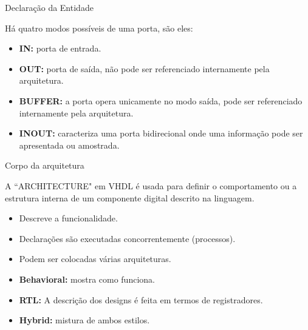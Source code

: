 \documentclass[aspectratio=169]{beamer}
\begin{document}
\begin{frame}{Declaração da Entidade}
	\justifying
	
	Há quatro modos possíveis de uma porta, são eles:
	
	\begin{itemize}
		\item \textbf{IN:} porta de entrada.
		\item \textbf{OUT:} porta de saída, não pode ser referenciado internamente pela arquitetura.
		\item \textbf{BUFFER:} a porta opera unicamente no modo saída, pode ser referenciado internamente pela arquitetura.
		\item \textbf{INOUT:} caracteriza uma porta bidirecional onde uma informação pode ser apresentada ou amostrada.
	\end{itemize}
	
	
	
\end{frame}
\begin{frame}{Corpo da arquitetura}
	\justifying
	
	
	\begin{block}{}
	\justifying
	A ``ARCHITECTURE" em VHDL é usada para definir o comportamento ou a estrutura interna de um componente digital descrito na linguagem. 
	
	\begin{itemize}
	\item Descreve a funcionalidade.
	\item Declarações são executadas concorrentemente (processos).
	\item Podem ser colocadas várias arquiteturas.
	\item \textbf{Behavioral:} mostra como funciona.
	\item \textbf{RTL:} A descrição dos designs é feita em termos de registradores.
	\item \textbf{Hybrid:} mistura de ambos estilos.
	\end{itemize}	
	
	\end{block}	

	
	
\end{frame}
\end{document}
